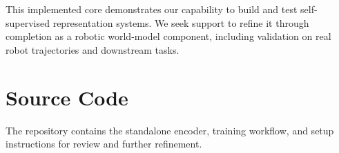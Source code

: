 This implemented core demonstrates our capability to build and test
self-supervised representation systems. We seek support to refine it through
completion as a robotic world-model component, including validation on real
robot trajectories and downstream tasks.

\section{Source Code}
The repository contains the standalone encoder, training workflow, and setup
instructions for review and further refinement.






